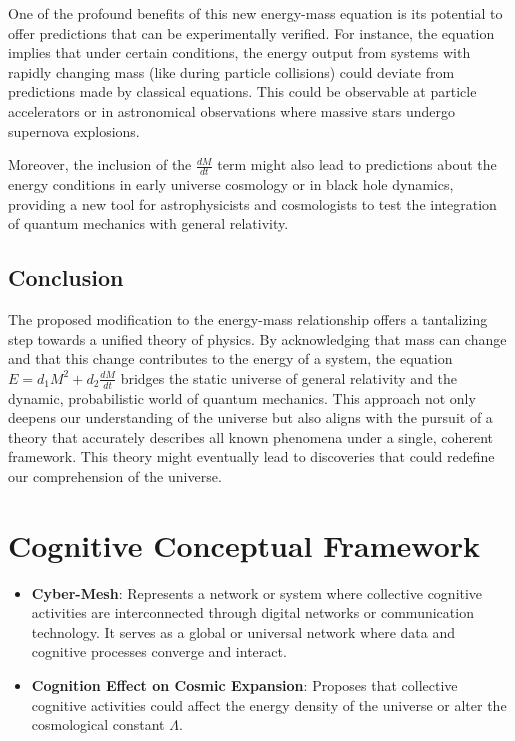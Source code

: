 \documentclass{article}
\begin{document}
One of the profound benefits of this new energy-mass equation is its potential to offer predictions that can be experimentally verified. For instance, the equation implies that under certain conditions, the energy output from systems with rapidly changing mass (like during particle collisions) could deviate from predictions made by classical equations. This could be observable at particle accelerators or in astronomical observations where massive stars undergo supernova explosions.

Moreover, the inclusion of the \(\frac{dM}{dt}\) term might also lead to predictions about the energy conditions in early universe cosmology or in black hole dynamics, providing a new tool for astrophysicists and cosmologists to test the integration of quantum mechanics with general relativity.

\subsection*{Conclusion}

The proposed modification to the energy-mass relationship offers a tantalizing step towards a unified theory of physics. By acknowledging that mass can change and that this change contributes to the energy of a system, the equation \(E = d_1 M^2 + d_2 \frac{dM}{dt}\) bridges the static universe of general relativity and the dynamic, probabilistic world of quantum mechanics. This approach not only deepens our understanding of the universe but also aligns with the pursuit of a theory that accurately describes all known phenomena under a single, coherent framework. This theory might eventually lead to discoveries that could redefine our comprehension of the universe.
\section{Cognitive Conceptual Framework}
\begin{itemize}
    \item \textbf{Cyber-Mesh}: Represents a network or system where collective cognitive activities are interconnected through digital networks or communication technology. It serves as a global or universal network where data and cognitive processes converge and interact.
    \item \textbf{Cognition Effect on Cosmic Expansion}: Proposes that collective cognitive activities could affect the energy density of the universe or alter the cosmological constant $\Lambda$.
\end{itemize}
\end{document}
